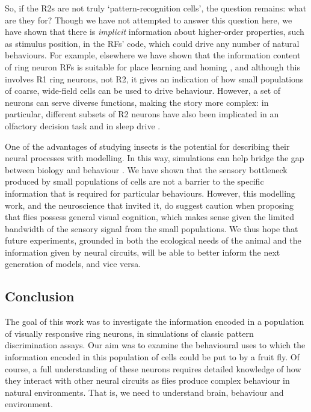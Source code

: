 So, if the R2s are not truly `pattern-recognition cells', the question remains: what are they for?
Though we have not attempted to answer this question here, we have shown that there is \emph{implicit} information about higher-order properties, such as stimulus position, in the \acp{RF}' code, which could drive any number of natural behaviours.
For example, elsewhere we have shown that the information content of ring neuron \acp{RF} is suitable for place learning and homing \cite{Dewar2015}, and although this involves R1 ring neurons, not R2, it gives an indication of how small populations of coarse, wide-field cells can be used to drive behaviour.
However, a set of neurons can serve diverse functions, making the story more complex: in particular, different subsets of R2 neurons have also been implicated in an olfactory decision task \cite{Azanchi2013} and in sleep drive \cite{Liu2016}.

One of the advantages of studying insects is the potential for describing their neural processes with modelling.
In this way, simulations can help bridge the gap between biology and behaviour \cite{Webb2009}.
We have shown that the sensory bottleneck produced by small populations of cells are not a barrier to the specific information that is required for particular behaviours.
However, this modelling work, and the neuroscience that invited it, do suggest caution when proposing that flies possess general visual cognition, which makes sense given the limited bandwidth of the sensory signal from the small populations.
We thus hope that future experiments, grounded in both the ecological needs of the animal and the information given by neural circuits, will be able to better inform the next generation of models, and vice versa.

\subsection*{Conclusion}
The goal of this work was to investigate the information encoded in a population of visually responsive ring neurons, in simulations of classic pattern discrimination assays.
Our aim was to examine the behavioural uses to which the information encoded in this population of cells could be put to by a fruit fly.
Of course, a full understanding of these neurons requires detailed knowledge of how they interact with other neural circuits as flies produce complex behaviour in natural environments.
That is, we need to understand brain, behaviour and environment.

